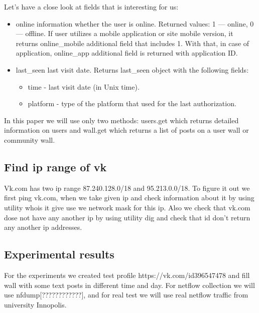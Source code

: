 Let’s have a close look at fields that is interesting for us:
\begin{itemize}
	\item{online information whether the user is online.  Returned values: 1 — online, 0 — offline.  If user utilizes a mobile application or site mobile version, it returns online{\_}mobile additional field that includes 1. With that, in case of application, online{\_}app additional field is returned with application ID.}  
	\item{last{\_}seen	last visit date.  Returns last{\_}seen object with the following fields:
	\begin{itemize}
		\item{time - last visit date (in Unix time).}
		\item{platform - type of the platform that used for the last authorization.}
	\end{itemize}}
\end{itemize}

In this paper we will use only two methods: users.get which returns detailed information on users and wall.get which returns a list of posts on a user wall or community wall.


\subsection{Find ip range of vk}
Vk.com has two ip range 87.240.128.0/18 and 95.213.0.0/18. To figure it out we first ping vk.com, when we take given ip and check information about it by using utility whois it give use we network mask for this ip. Also we check that vk.com dose not have any another ip by using utility dig and check that id don't return any another ip addresses.


\subsection{Experimental results}
For the experiments we created test profile https://vk.com/id396547478 and fill wall with some text posts in different time and day. For netflow collection we will use nfdump[????????????], and for real test we will use real netflow traffic from university Innopolis. 
